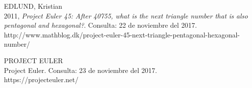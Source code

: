 \documentclass[12pt]{article}
\begin{document}

\begin{thebibliography}{9}
      EDLUND, Kristian\\
      2011, \textit{Project Euler 45: After 40755, what is the next triangle number that is also pentagonal and hexagonal?}. Consulta: 22 de noviembre del 2017.\\
      http://www.mathblog.dk/project-euler-45-next-triangle-pentagonal-hexagonal-number/

      PROJECT EULER\\
      Project Euler. Consulta: 23 de noviembre del 2017.\\
      https://projecteuler.net/
\end{thebibliography}
\end{document}

